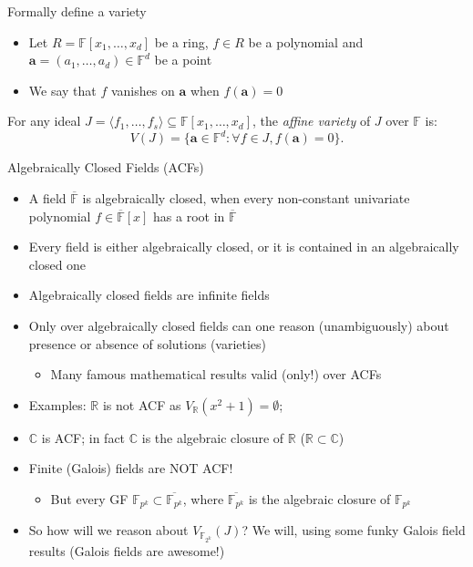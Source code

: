 \documentclass[xcolor=dvipsnames]{beamer}
\newcommand{\R}{{\mathbb{R}}}
\newcommand{\C}{{\mathbb{C}}}
\newcommand{\F}{{\mathbb{F}}}
\newcommand{\Fbar}{{\overline{\mathbb{F}}}}
\newcommand{\Fkk}{{\mathbb{F}}_{2^k}}
\newcommand{\bi}{\begin{itemize}}
\newcommand{\ei}{\end{itemize}}
\begin{document}

\begin{frame}{{\large Formally define a variety}}

\bi
\item Let $R = \F[x_1, \dots, x_d]$ be a ring, $f \in R$ be a
  polynomial and $\mathbf{a} = (a_1, \dots, a_d) \in \F^d$ be a point
\item We say that $f$ \alert{vanishes} on $\mathbf{a}$ when
  $f(\mathbf{a})=0$
\ei

\begin{Definition}
For any ideal $J = \langle f_1, \dots, f_s \rangle \subseteq
\mathbb{F}[x_1,\dots, x_d]$, the {\it affine variety} of $J$ over
$\mathbb{F}$ is:
$$V(J) = \{\mathbf{a} \in \mathbb{F}^d: \forall f \in
J, f(\mathbf{a}) = 0\}.$$ 
\end{Definition}

\end{frame}


\begin{frame}{{\large Algebraically Closed Fields (ACFs)}}

\bi
\item A field $\Fbar$ is algebraically closed, when every non-constant
  univariate polynomial $f \in \Fbar[x]$ has a root in $\Fbar$
\item Every field is either algebraically closed, or it is contained
  in an algebraically closed one  
\item Algebraically closed fields are infinite fields
\item Only over algebraically closed fields can one reason
  (unambiguously) about presence or absence of solutions (varieties)  
\bi
\item Many famous mathematical results valid (only!) over ACFs
\ei
\item Examples: $\R$ is not ACF as $V_{\mathbb{R}}(x^2+1)=\emptyset$; 
\item $\C$ is ACF; in fact $\C$ is the algebraic closure of $\R$ ($\R
  \subset \C$)
\item Finite (Galois) fields are NOT ACF! 
\bi
\item But every GF $\F_{p^k} \subset \overline{\F_{p^k}}$, where 
$\overline{\F_{p^k}}$ is the algebraic closure of $\F_{p^k}$
\ei
\item So how will we reason about $V_{\Fkk}(J)$? We will, using some
  funky Galois field results (Galois fields are awesome!)
\ei

\end{frame}
\end{document}
